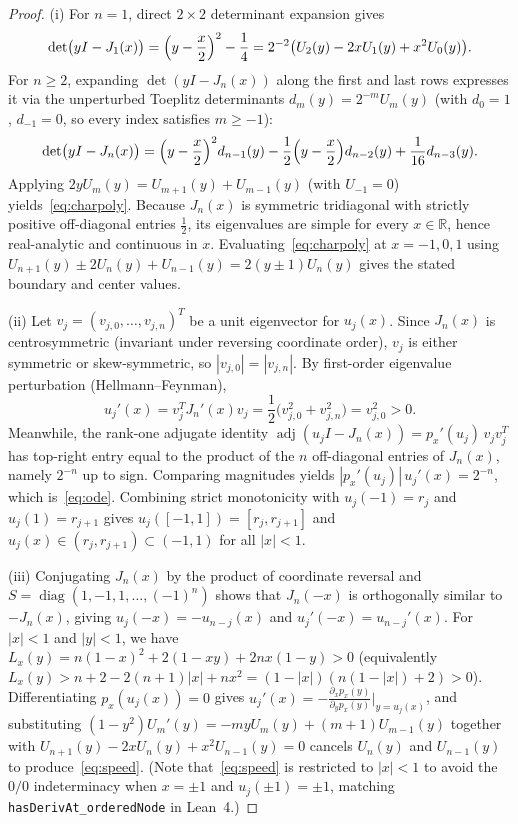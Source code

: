 \documentclass[11pt,a4paper]{article}
\newcommand{\R}{\mathbb{R}}
\newcommand{\adj}{\operatorname{adj}}
\newcommand{\diag}{\operatorname{diag}}
\newcommand{\code}[1]{\nolinkurl{#1}}
\theoremstyle{remark}
\numberwithin{equation}{section}
\begin{document}
\begin{proof}
(i) For $n = 1$, direct $2 \times 2$ determinant expansion gives
\[
    \det\bigl(yI - J_1(x)\bigr)
    = \Bigl(y - \frac{x}{2}\Bigr)^2 - \frac14
    = 2^{-2}\bigl(U_2(y) - 2xU_1(y) + x^2 U_0(y)\bigr).
\]
For $n \ge 2$, expanding $\det(yI - J_n(x))$ along the first and last rows expresses it via the unperturbed Toeplitz determinants $d_m(y) = 2^{-m}U_m(y)$ (with $d_0 = 1$, $d_{-1} = 0$, so every index satisfies $m \ge -1$):
\[
    \det\bigl(yI - J_n(x)\bigr)
    = \Bigl(y - \frac{x}{2}\Bigr)^2 d_{n-1}(y)
      - \frac12\Bigl(y - \frac{x}{2}\Bigr)d_{n-2}(y)
      + \frac{1}{16} d_{n-3}(y).
\]
Applying $2yU_m(y) = U_{m+1}(y) + U_{m-1}(y)$ (with $U_{-1} = 0$) yields~\eqref{eq:charpoly}. Because $J_n(x)$ is symmetric tridiagonal with strictly positive off-diagonal entries $\frac12$, its eigenvalues are simple for every $x \in \R$, hence real-analytic and continuous in $x$. Evaluating~\eqref{eq:charpoly} at $x = -1, 0, 1$ using $U_{n+1}(y) \pm 2U_n(y) + U_{n-1}(y) = 2(y \pm 1)U_n(y)$ gives the stated boundary and center values.

(ii) Let $v_j = (v_{j,0}, \dots, v_{j,n})^T$ be a unit eigenvector for $u_j(x)$. Since $J_n(x)$ is centrosymmetric (invariant under reversing coordinate order), $v_j$ is either symmetric or skew-symmetric, so $|v_{j,0}| = |v_{j,n}|$. By first-order eigenvalue perturbation (Hellmann--Feynman),
\[
    u_j'(x) = v_j^T J_n'(x) v_j = \frac12\bigl(v_{j,0}^2 + v_{j,n}^2\bigr) = v_{j,0}^2 > 0.
\]
Meanwhile, the rank-one adjugate identity $\adj(u_j I - J_n(x)) = p_x'(u_j)\, v_j v_j^T$ has top-right entry equal to the product of the $n$ off-diagonal entries of $J_n(x)$, namely $2^{-n}$ up to sign. Comparing magnitudes yields $|p_x'(u_j)|\,u_j'(x) = 2^{-n}$, which is~\eqref{eq:ode}. Combining strict monotonicity with $u_j(-1) = r_j$ and $u_j(1) = r_{j+1}$ gives $u_j([-1,1]) = [r_j, r_{j+1}]$ and $u_j(x) \in (r_j, r_{j+1}) \subset (-1,1)$ for all $|x| < 1$.

(iii) Conjugating $J_n(x)$ by the product of coordinate reversal and $S = \diag(1, -1, 1, \dots, (-1)^n)$ shows that $J_n(-x)$ is orthogonally similar to $-J_n(x)$, giving $u_j(-x) = -u_{n-j}(x)$ and $u_j'(-x) = u_{n-j}'(x)$. For $|x| < 1$ and $|y| < 1$, we have $L_x(y) = n(1 - x)^2 + 2(1 - xy) + 2n x(1 - y) > 0$ (equivalently $L_x(y) > n + 2 - 2(n+1)|x| + nx^2 = (1 - |x|)(n(1 - |x|) + 2) > 0$). Differentiating $p_x(u_j(x)) = 0$ gives $u_j'(x) = -\frac{\partial_x p_x(y)}{\partial_y p_x(y)}\big|_{y=u_j(x)}$, and substituting $(1-y^2)U_m'(y) = -m y U_m(y) + (m+1)U_{m-1}(y)$ together with $U_{n+1}(y) - 2xU_n(y) + x^2 U_{n-1}(y) = 0$ cancels $U_n(y)$ and $U_{n-1}(y)$ to produce~\eqref{eq:speed}. (Note that~\eqref{eq:speed} is restricted to $|x| < 1$ to avoid the $0/0$ indeterminacy when $x = \pm 1$ and $u_j(\pm 1) = \pm 1$, matching \code{hasDerivAt_orderedNode} in Lean~4.)
\end{proof}
\end{document}
